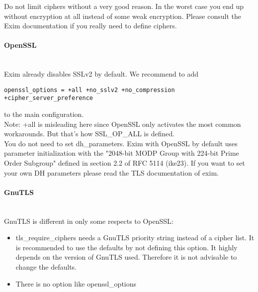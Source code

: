 Do not limit ciphers without a very good reason. In the worst case you end up without encryption at all instead of some weak encryption. Please consult the Exim documentation if you really need to define ciphers.

\paragraph*{OpenSSL}\mbox{}\\
Exim already disables SSLv2 by default. We recommend to add
\begin{lstlisting}[breaklines]
  openssl_options = +all +no_sslv2 +no_compression +cipher_server_preference
\end{lstlisting}
to the main configuration.\\
Note: +all is misleading here since OpenSSL only activates the most common workarounds. But that's how SSL\_OP\_ALL is defined.\\

You do not need to set dh\_parameters. Exim with OpenSSL by default uses parameter initialization with the "2048-bit MODP Group with 224-bit Prime Order Subgroup" defined in section 2.2 of RFC 5114\cite{rfc5114} (ike23).
If you want to set your own DH parameters please read the TLS documentation of exim.\\



\paragraph*{GnuTLS}\mbox{}\\

GnuTLS is different in only some respects to OpenSSL:
\begin{itemize}
\item tls\_require\_ciphers needs a GnuTLS priority string instead of a cipher list. It is recommended to use the defaults by not defining this option. It highly depends on the version of GnuTLS used. Therefore it is not advisable to change the defaults.
\item There is no option like openssl\_options
\end{itemize}

